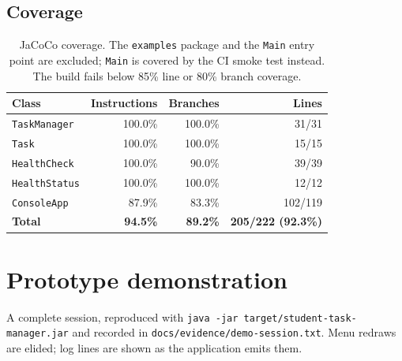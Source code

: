\documentclass[11pt,a4paper]{article}
\newcommand{\code}[1]{\texttt{\small #1}}
\begin{document}
\subsection{Coverage}

\begin{table}[h]
\centering
\small
\begin{tabular}{@{}l r r r@{}}
\toprule
\textbf{Class} & \textbf{Instructions} & \textbf{Branches} & \textbf{Lines} \\
\midrule
\code{TaskManager}  & 100.0\% & 100.0\% & 31/31 \\
\code{Task}         & 100.0\% & 100.0\% & 15/15 \\
\code{HealthCheck}  & 100.0\% &  90.0\% & 39/39 \\
\code{HealthStatus} & 100.0\% & 100.0\% & 12/12 \\
\code{ConsoleApp}   &  87.9\% &  83.3\% & 102/119 \\
\midrule
\textbf{Total}      & \textbf{94.5\%} & \textbf{89.2\%} & \textbf{205/222 (92.3\%)} \\
\bottomrule
\end{tabular}
\caption{JaCoCo coverage. The \code{examples} package and the \code{Main} entry
point are excluded; \code{Main} is covered by the CI smoke test instead. The
build fails below 85\% line or 80\% branch coverage.}
\end{table}

\section{Prototype demonstration}
\label{sec:demo}

A complete session, reproduced with
\code{java -jar target/student-task-manager.jar} and recorded in
\code{docs/evidence/demo-session.txt}. Menu redraws are elided; log lines are
shown as the application emits them.
\end{document}
